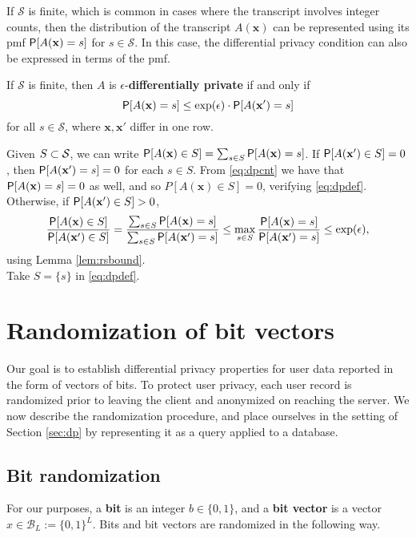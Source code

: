 \documentclass[11pt,draft]{article}
\newcommand{\Ssp}{\mathcal{S}}
\newcommand{\Bsp}{\mathcal{B}}
\newcommand{\xv}{\mathbf{x}}
\begin{document}

If $\Ssp$ is finite, which is common in cases where the transcript involves integer counts, then the distribution of the transcript $A(\xv)$ can be represented using its pmf $\P[A(\xv) = s]$ for $s \in \Ssp$.
In this case, the differential privacy condition can also be expressed in terms of the pmf.
\begin{prop} \label{prop:dpcnt}
If $\Ssp$ is finite, then $A$ is $\epsilon$-\textbf{differentially private} if and only if
\begin{equation} \label{eq:dpcnt}
\P[A(\xv) = s] \leq \exp(\epsilon) \cdot \P[A(\xv') = s]
\end{equation}
for all $s\in\Ssp$, where $\xv,\xv'$ differ in one row.
\end{prop}
\begin{pf}
\pfleftdir
Given $S \cont \Ssp$, we can write
$\P[A(\xv) \in S] = \sum_{s \in S} \P[A(\xv) = s]$.
If $\P[A(\xv') \in S] = 0$, then $\P[A(\xv') = s] = 0$ for each $s \in S$.
From \eqref{eq:dpcnt} we have that $\P[A(\xv) = s] = 0$ as well, and so $P[A(\xv) \in S] = 0$, verifying \eqref{eq:dpdef}.
Otherwise, if $\P[A(\xv') \in S] > 0$,
\[ \frac{\P[A(\xv) \in S]}{\P[A(\xv') \in S]}
= \frac{\sum_{s \in S} \P[A(\xv) = s]}{\sum_{s \in S} \P[A(\xv') = s]}
\leq \max_{s \in S} \frac{\P[A(\xv) = s]}{\P[A(\xv') = s]}
\leq \exp(\epsilon), \]
using Lemma \ref{lem:rsbound}.\\
\pfrightdir Take $S = \{s\}$ in \eqref{eq:dpdef}.
\end{pf}


\section{Randomization of bit vectors}

Our goal is to establish differential privacy properties for user data reported
in the form of vectors of bits.
To protect user privacy, each user record is randomized prior to leaving the
client and anonymized on reaching the server.
We now describe the randomization procedure, and place ourselves in the setting
of Section \ref{sec:dp} by representing it as a query applied to a database.

\subsection{Bit randomization}

For our purposes, a \textbf{bit} is an integer $b \in \{0,1\}$, and a
\textbf{bit vector} is a vector $x \in \Bsp_L := \{0,1\}^L$.
Bits and bit vectors are randomized in the following way.
\end{document}
